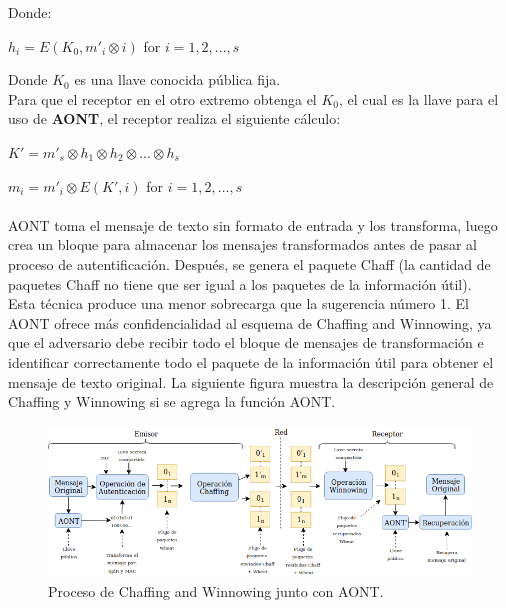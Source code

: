 \documentclass[12pt, a4paper, titlepage]{report}
\begin{document}
        Donde:
        \begin{center}
            $h_i=E(K_0,m'_i \otimes i)$ for $i=1,2,...,s$
        \end{center}
        
        Donde $K_0$ es una llave conocida pública fija.\\
        Para que el receptor en el otro extremo obtenga el $K_0$, el cual es la llave para el uso de \textbf{AONT}, el receptor realiza el siguiente cálculo:
        
        \begin{center}
            $K'=m'_s \otimes h_1 \otimes h_2 \otimes ... \otimes h_s$
        \end{center}
        \begin{center}
            $m_i=m'_i \otimes E(K',i)$ for $i=1,2,...,s$
        \end{center}
        
        \paragraph{}
        AONT toma el mensaje de texto sin formato de entrada y los transforma, luego crea un bloque para almacenar los mensajes transformados antes de pasar al proceso de autentificación. Después, se genera el paquete Chaff (la cantidad de paquetes Chaff no tiene que ser igual a los paquetes de la informaci\'on \'util).\\
        Esta técnica produce una menor sobrecarga que la sugerencia número 1. El AONT ofrece más confidencialidad al esquema de Chaffing and Winnowing, ya que el adversario debe recibir todo el bloque de mensajes de transformación e identificar correctamente todo el paquete de la informaci\'on \'util para obtener el mensaje de texto original. La siguiente figura muestra la
        descripción general de Chaffing y Winnowing si se agrega la función AONT.
        
        \begin{figure}[H]
			\begin{center}	          \includegraphics[width=14cm]{./imagenes/MarcoTeorico/chaffVsCrypto.png}
				\caption{Proceso de Chaffing and Winnowing junto con AONT.}
			\end{center}
		\end{figure}
		\label{C&W_AONT}
		
\end{document}
